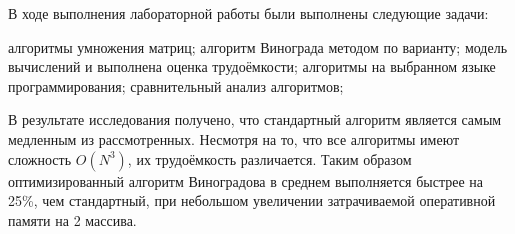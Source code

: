 
В ходе выполнения лабораторной работы были выполнены следующие задачи:
\begin{itemize}
	 алгоритмы умножения матриц;
	 алгоритм Винограда методом по варианту;
	 модель вычислений и выполнена оценка трудоёмкости;
	 алгоритмы на выбранном языке программирования;
	 сравнительный анализ алгоритмов;
\end{itemize}

В результате исследования получено, что стандартный алгоритм является самым медленным из рассмотренных. Несмотря на то, что все алгоритмы имеют сложность \(O(N^3)\), их трудоёмкость различается. Таким образом оптимизированный алгоритм Виноградова в среднем выполняется быстрее на 25\%, чем стандартный, при небольшом увеличении затрачиваемой оперативной памяти на 2 массива.
